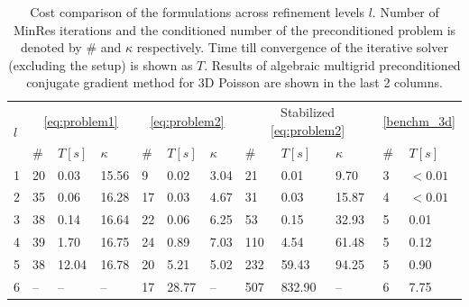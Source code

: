 \begin{table}
  \scriptsize{
  \begin{center}
    \begin{tabular}{l|lll|lll|lll|ll}
      \toprule
      \multirow{2}{*}{$l$} & \multicolumn{3}{c|}{\eqref{eq:problem1}} & \multicolumn{3}{c|}{\eqref{eq:problem2}} & \multicolumn{3}{c|}{ Stabilized \eqref{eq:problem2}} & \multicolumn{2}{c}{\eqref{benchm_3d}}\\
      \cline{2-12}
      & \# & $T\left[s\right]$ & $\kappa$ & \# & $T\left[s\right]$ & $\kappa$ & \# & $T\left[s\right]$ & $\kappa$ & \# & $T\left[s\right]$\\
      \hline
      1 & 20 & 0.03  & 15.56 & 9  & 0.02  & 3.04 & 21  & 0.01   & 9.70  &3 & $<0.01$\\ 
      2 & 35 & 0.06  & 16.28 & 17 & 0.03  & 4.67 & 31  & 0.03   & 15.87 &4 & $<0.01$\\ 
      3 & 38 & 0.14  & 16.64 & 22 & 0.06  & 6.25 & 53  & 0.15   & 32.93 &5 & 0.01   \\ 
      4 & 39 & 1.70  & 16.75 & 24 & 0.89  & 7.03 & 110 & 4.54   & 61.48 &5 & 0.12   \\ 
      5 & 38 & 12.04 & 16.78 & 20 & 5.21  & 5.02 & 232 & 59.43  & 94.25 &5 & 0.90  \\ 
      6 & -- & --    & --    & 17 & 28.77 & --   & 507 & 832.90 & --    &6 & 7.75  \\ 
      \bottomrule
    \end{tabular}
    \end{center}
    }
  \caption{Cost comparison of the formulations across refinement levels $l$.
    Number of MinRes iterations and the conditioned number of the preconditioned
    problem is denoted by $\#$ and $\kappa$ respectively. Time till convergence
    of the iterative solver (excluding the setup) is shown as $T$. Results of algebraic
    multigrid preconditioned conjugate gradient method for 3D Poisson are shown
    in the last 2 columns.
  }
\label{tab:cost}
\end{table}








